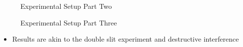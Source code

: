\begin{itemize}
\begin{itemize}
        \begin{figure}[H]
          \centering
          
          \caption{Experimental Setup Part Two}
          \label{fig:6}
        \end{figure}

        \begin{figure}[H]
          \centering
          
          \caption{Experimental Setup Part Three}
          \label{fig:7}
        \end{figure}

        \begin{itemize}

          \item Results are akin to the double slit experiment and destructive interference

        \end{itemize}

    \end{itemize}

\end{itemize}



